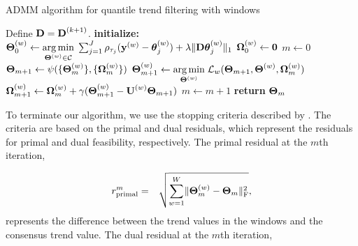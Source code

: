 \documentclass[aoas]{imsart}
\newcommand{\V}[1]{{\bm{\mathbf{\MakeLowercase{#1}}}}} %
\newcommand{\Vn}[2]{\V{#1}^{(#2)}} %
\newcommand{\M}[1]{{\bm{\mathbf{\MakeUppercase{#1}}}}} %
\newcommand{\Mn}[2]{\M{#1}^{(#2)}} %
\begin{document}
\begin{algorithm}[t]
	\caption{ADMM algorithm for quantile trend filtering with windows}\label{alg:admm}
	\begin{algorithmic}
		\State Define $\M{D} = \Mn{D}{k+1}$.
		\State \textbf{initialize:}
		\State $\Mn{\Theta}{w}_0 \gets \underset{\Mn{\Theta}{w} \in \mathcal{C}}{\arg \min}\;
		\sum_{j=1}^J\rho_{\tau_j}(\Vn{y}{w} - \Vn{\theta}{w}_{j})+\lambda \lVert \M{D}\Vn{\theta}{w}_{j}\rVert_1$
		\State $\Mn{\Omega}{w}_0 \gets \M{0}$
		\EndFor
		\State $m \gets 0$
		\Repeat{}
		\State $\M{\Theta}_{m+1} \gets \psi(\{\Mn{\Theta}{w}_m\}, \{\Mn{\Omega}{w}_m\})$
		\State $\Mn{\Theta}{w}_{m+1} \gets \underset{\Mn{\Theta}{w}}{\arg\min}\; \mathcal{L}_w(\M{\Theta}_{m+1}, \Mn{\Theta}{w}, \Mn{\Omega}{w}_{m})$
		\State
		$\Mn{\Omega}{w}_{m+1} \gets \Mn{\Omega}{w}_m + \gamma(\Mn{\Theta}{w}_{m+1} - \Mn{U}{w}\M{\Theta}_{m+1})$
		\EndFor
		\State $m \gets m + 1$
		\State \textbf{return} $\M{\Theta}_m$
	\end{algorithmic}
\end{algorithm}

To terminate our algorithm, we use the stopping criteria described by \cite{boyd2011distributed}. The criteria are based on the primal and dual residuals, which represent the residuals for primal and dual feasibility, respectively. The primal residual at the $m$th iteration,

\begin{eqnarray*}
	r_{\text{primal}}^{m} & = & \sqrt{\sum_{w=1}^W\lVert\Mn{\Theta}{w}_{m} - \M{\Theta}_m\rVert_{\text{F}}^2},
\end{eqnarray*}
represents the difference between the trend values in the windows and the consensus trend value. The dual residual at the $m$th iteration,
\end{document}
